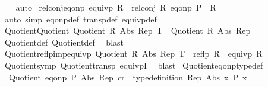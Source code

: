 \begin{isabellebody}
%
\isadelimproof
\ \ %
\endisadelimproof
%
\isatagproof
{}\isamarkupfalse%
\ {\isacharparenleft}{\kern0pt}auto{\isacharparenright}{\kern0pt}%
\endisatagproof
{\isafoldproof}%
%
\isadelimproof
\isanewline
%
\endisadelimproof
\isanewline
{}\isamarkupfalse%
\ rel{\isacharunderscore}{\kern0pt}conj{\isacharunderscore}{\kern0pt}eq{\isacharunderscore}{\kern0pt}onp{\isacharcolon}{\kern0pt}\ {\isachardoublequoteopen}equivp\ R\ {\isasymLongrightarrow}\ rel{\isacharunderscore}{\kern0pt}conj\ R\ {\isacharparenleft}{\kern0pt}eq{\isacharunderscore}{\kern0pt}onp\ P{\isacharparenright}{\kern0pt}\ {\isasymle}\ R{\isachardoublequoteclose}\isanewline
%
\isadelimproof
\ \ %
\endisadelimproof
%
\isatagproof
{}\isamarkupfalse%
\ {\isacharparenleft}{\kern0pt}auto\ simp{\isacharcolon}{\kern0pt}\ eq{\isacharunderscore}{\kern0pt}onp{\isacharunderscore}{\kern0pt}def\ transp{\isacharunderscore}{\kern0pt}def\ equivp{\isacharunderscore}{\kern0pt}def{\isacharparenright}{\kern0pt}%
\endisatagproof
{\isafoldproof}%
%
\isadelimproof
\isanewline
%
\endisadelimproof
\isanewline
{}\isamarkupfalse%
\ Quotient{\isacharunderscore}{\kern0pt}Quotient{}{\isacharcolon}{\kern0pt}\ {\isachardoublequoteopen}Quotient\ R\ Abs\ Rep\ T\ {\isasymLongrightarrow}\ Quotient{}\ R\ Abs\ Rep{\isachardoublequoteclose}\isanewline
%
\isadelimproof
\ \ %
\endisadelimproof
%
\isatagproof
{}\isamarkupfalse%
\ Quotient{\isacharunderscore}{\kern0pt}def\ Quotient{}{\isacharunderscore}{\kern0pt}def\ \isamarkupfalse%
\ blast%
\endisatagproof
{\isafoldproof}%
%
\isadelimproof
\isanewline
%
\endisadelimproof
\isanewline
{}\isamarkupfalse%
\ Quotient{\isacharunderscore}{\kern0pt}reflp{\isacharunderscore}{\kern0pt}imp{\isacharunderscore}{\kern0pt}equivp{\isacharcolon}{\kern0pt}\ {\isachardoublequoteopen}Quotient\ R\ Abs\ Rep\ T\ {\isasymLongrightarrow}\ reflp\ R\ {\isasymLongrightarrow}\ equivp\ R{\isachardoublequoteclose}\isanewline
%
\isadelimproof
\ \ %
\endisadelimproof
%
\isatagproof
{}\isamarkupfalse%
\ Quotient{\isacharunderscore}{\kern0pt}symp\ Quotient{\isacharunderscore}{\kern0pt}transp\ equivpI\ \isamarkupfalse%
\ blast%
\endisatagproof
{\isafoldproof}%
%
\isadelimproof
\isanewline
%
\endisadelimproof
\isanewline
{}\isamarkupfalse%
\ Quotient{\isacharunderscore}{\kern0pt}eq{\isacharunderscore}{\kern0pt}onp{\isacharunderscore}{\kern0pt}typedef{\isacharcolon}{\kern0pt}\isanewline
\ \ {\isachardoublequoteopen}Quotient\ {\isacharparenleft}{\kern0pt}eq{\isacharunderscore}{\kern0pt}onp\ P{\isacharparenright}{\kern0pt}\ Abs\ Rep\ cr\ {\isasymLongrightarrow}\ type{\isacharunderscore}{\kern0pt}definition\ Rep\ Abs\ {\isacharbraceleft}{\kern0pt}x{\isachardot}{\kern0pt}\ P\ x{\isacharbraceright}{\kern0pt}{\isachardoublequoteclose}\isanewline

\end{isabellebody}
